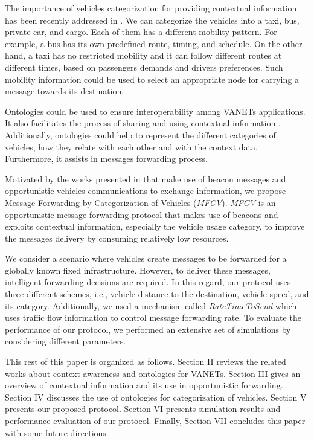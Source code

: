 \documentclass[letterpaper, 10 pt, conference]{ieeeconf}  %
\begin{document}
The importance of vehicles categorization for providing contextual information has been recently addressed in \cite{zhang2012, zhang2014}. We can categorize the vehicles into a taxi, bus, private car, and cargo. Each of them has a different mobility pattern. For example, a bus has its own predefined route, timing, and schedule. On the other hand, a taxi has no restricted mobility and it can follow different routes at different times, based on passengers demands and drivers preferences. Such mobility information could be used to select an appropriate node for carrying a message towards its destination.

Ontologies could be used to ensure interoperability among VANETs applications. It also facilitates the process of sharing and using contextual information \cite{madkour2011}. Additionally, ontologies could help to represent the different categories of vehicles, how they relate with each other and with the context data. Furthermore, it assists in messages forwarding process.

Motivated by the works presented in \cite{Yokoyama_2014, ullahadvertising} that make use of beacon messages and opportunistic vehicles communications to exchange information, we propose Message Forwarding by Categorization of Vehicles (\emph{MFCV}). \emph{MFCV} is an opportunistic message forwarding protocol that makes use of beacons and exploits contextual information, especially the vehicle usage category, to improve the messages delivery by consuming relatively low resources.

We consider a scenario where vehicles create messages to be forwarded for a globally known fixed infrastructure. However, to deliver these messages, intelligent forwarding decisions are required. In this regard, our protocol uses three different schemes, i.e., vehicle distance to the destination, vehicle speed, and its category. Additionally, we used a mechanism called \emph{RateTimeToSend} which uses traffic flow information to control message forwarding rate. To evaluate the performance of our protocol, we performed an extensive set of simulations by considering different parameters.

This rest of this paper is organized as follows. Section II reviews the related works about context-awareness and ontologies for VANETs. Section III gives an overview of contextual information and its use in opportunistic forwarding. Section IV discusses the use of ontologies for categorization of vehicles. Section V presents our proposed protocol. Section VI presents simulation results and performance evaluation of our protocol. Finally, Section VII concludes this paper with some future directions.
\end{document}
